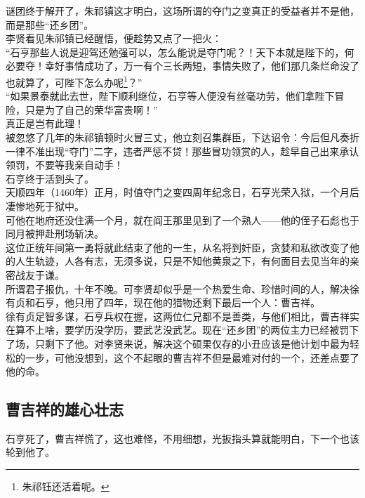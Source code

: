 \begin{multicols}{\theparacolNo}
谜团终于解开了，朱祁镇这才明白，这场所谓的夺门之变真正的受益者并不是他，而是那些“还乡团”。\\

李贤看见朱祁镇已经醒悟，便趁势又点了一把火：\\

“石亨那些人说是迎驾还勉强可以，怎么能说是夺门呢？！天下本就是陛下的，何必要夺！幸好事情成功了，万一有个三长两短，事情失败了，他们那几条烂命没了也就算了，可陛下怎么办呢\footnote{朱祁钰还活着呢。}？”\\

“如果景泰就此去世，陛下顺利继位，石亨等人便没有丝毫功劳，他们拿陛下冒险，只是为了自己的荣华富贵啊！”\\

真正是岂有此理！\\

被忽悠了几年的朱祁镇顿时火冒三丈，他立刻召集群臣，下达诏令：今后但凡奏折一律不准出现“夺门”二字，违者严惩不贷！那些冒功领赏的人，趁早自己出来承认领罚，不要等我亲自动手！\\

石亨终于活到头了。\\

天顺四年（1460年）正月，时值夺门之变四周年纪念日，石亨光荣入狱，一个月后凄惨地死于狱中。\\

可他在地府还没住满一个月，就在阎王那里见到了一个熟人——他的侄子石彪也于同月被押赴刑场斩决。\\

这位正统年间第一勇将就此结束了他的一生，从名将到奸臣，贪婪和私欲改变了他的人生轨迹，人各有志，无须多说，只是不知他黄泉之下，有何面目去见当年的亲密战友于谦。\\

所谓君子报仇，十年不晚。可李贤却似乎是一个热爱生命、珍惜时间的人，解决徐有贞和石亨，他只用了四年，现在他的猎物还剩下最后一个人：曹吉祥。\\

徐有贞足智多谋，石亨兵权在握，这两位仁兄都不是善类，与他们相比，曹吉祥实在算不上啥，要学历没学历，要武艺没武艺。现在“还乡团”的两位主力已经被罚下了场，只剩下了他。对李贤来说，解决这个硕果仅存的小丑应该是他计划中最为轻松的一步，可他没想到，这个不起眼的曹吉祥不但是最难对付的一个，还差点要了他的命。\\

\subsection{曹吉祥的雄心壮志}
石亨死了，曹吉祥慌了，这也难怪，不用细想，光扳指头算就能明白，下一个也该轮到他了。\\


\end{multicols}
